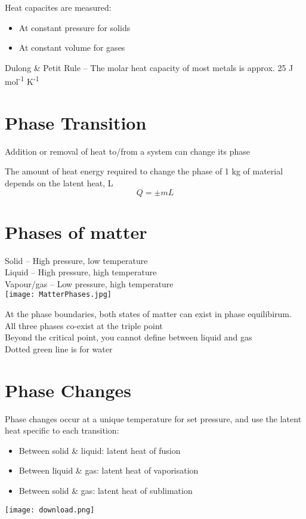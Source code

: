 \documentclass[a4paper, 11pt, fleqn, normalem]{report}
\begin{document}
Heat capacites are measured:
\vspace{-8pt}
\begin{itemize}
    \item[] At constant pressure for solids
    \item[] At constant volume for gases
\end{itemize}
Dulong \& Petit Rule -- The molar heat capacity of most metals is approx. 25 J mol\textsuperscript{-1} K\textsuperscript{-1}

\section*{Phase Transition}
Addition or removal of heat to/from a system can change its phase

The amount of heat energy required to change the phase of 1 kg of material depends on the latent heat, L
\begin{equation*}
    Q = \pm mL
\end{equation*}

\section*{Phases of matter}
Solid -- High pressure, low temperature \\
Liquid -- High pressure, high temperature \\
Vapour/gas -- Low pressure, high temperature \\
\texttt{[image: MatterPhases.jpg]}

At the phase boundaries, both states of matter can exist in phase equilibirum. \\
All three phases co-exist at the triple point \\
Beyond the critical point, you cannot define between liquid and gas \\
Dotted green line is for water

\section*{Phase Changes}
Phase changes occur at a unique temperature for set pressure, and use the latent heat specific to each transition:
\vspace{-8pt}
\begin{itemize}
    \item[] Between solid \& liquid: latent heat of fusion
    \item[] Between liquid \& gas: latent heat of vaporisation
    \item[] Between solid \& gas: latent heat of sublimation
\end{itemize}
\texttt{[image: download.png]}
\end{document}

